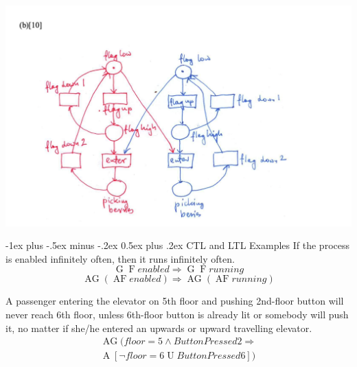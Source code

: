 \documentclass[letterpaper, 8pt]{extarticle}
\makeatletter
\renewcommand{\section}{\@startsection{section}{1}{0mm}%
                                {-1ex plus -.5ex minus -.2ex}%
                                {0.5ex plus .2ex}%
                                {\normalfont\normalsize\bfseries}}
\DeclareMathOperator{\F}{F}
\DeclareMathOperator{\G}{G}
\DeclareMathOperator{\U}{U}
\DeclareMathOperator{\A}{A}
\DeclareMathOperator{\AG}{AG}
\DeclareMathOperator{\AF}{AF}
\makeatother
\begin{document}
\begin{multicols*}{5}
  \includegraphics[width = \linewidth]{COMPSCI-2SD3/warring_neighbours_partb.png}

  \section{CTL and LTL Examples}
  If the process is enabled infinitely often, then it runs infinitely often.
  $$
    \G\F enabled \Rightarrow \G\F running
  $$
  $$
    \AG(\AF enabled) \Rightarrow \AG(\AF running)
  $$

  A passenger entering the elevator on 5th floor and pushing 2nd-floor button will never reach 6th floor, unless 6th-floor button is already lit or somebody will push it, no matter if she/he entered an upwards or upward travelling elevator.
  \begin{align*}
    \AG(floor=5 \land ButtonPressed2 \Rightarrow \\
    \A[\neg floor=6 \U ButtonPressed6])
  \end{align*}


\end{multicols*}
\end{document}
